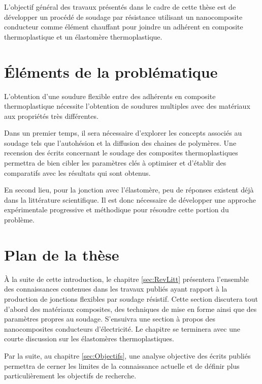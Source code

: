 L'objectif général des travaux présentés dans le cadre de cette thèse est de développer un procédé de soudage par résistance utilisant un nanocomposite conducteur comme élément chauffant pour joindre un adhérent en composite thermoplastique et un élastomère thermoplastique. 



\section{Éléments de la problématique}

L'obtention d'une soudure flexible entre des adhérents en composite thermoplastique nécessite l'obtention de soudures multiples avec des matériaux aux propriétés très différentes. 

Dans un premier temps, il sera nécessaire d'explorer les concepts associés au soudage tels que l'autohésion et la diffusion des chaines de polymères. 
Une recension des écrits concernant le soudage des composites thermoplastiques permettra de bien cibler les paramètres clés à optimiser et d'établir des comparatifs avec les résultats qui sont obtenus. 

En second lieu, pour la jonction avec l'élastomère, peu de réponses existent déjà dans la littérature scientifique.
Il est donc nécessaire de développer une approche expérimentale progressive et méthodique pour résoudre cette portion du problème. 

\section{Plan de la thèse}  %

À la suite de cette introduction, le chapitre \ref{sec:RevLitt} présentera l'ensemble des connaissances contenues dans les travaux publiés ayant rapport à la production de jonctions flexibles par soudage résistif. 
Cette section discutera tout d'abord des matériaux composites, des techniques de mise en forme ainsi que des paramètres propres au soudage. S'ensuivra une section à propos des nanocomposites conducteurs d'électricité. Le chapitre se terminera avec une courte discussion sur les élastomères thermoplastiques.

Par la suite, au chapitre \ref{sec:Objectifs}, une analyse objective des écrits publiés permettra de cerner les limites de la connaissance actuelle et de définir plus particulièrement les objectifs de recherche. 

